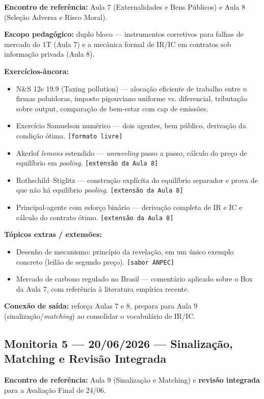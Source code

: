 \documentclass[11pt,a4paper]{article}
\newcommand{\ns}{N\&S 12e}
\begin{document}
\textbf{Encontro de referência:} Aula 7 (Externalidades e Bens Públicos) e Aula 8 (Seleção Adversa e Risco Moral).

\textbf{Escopo pedagógico:} duplo bloco --- instrumentos corretivos para falhas de mercado do 1T (Aula 7) e a mecânica formal de IR/IC em contratos sob informação privada (Aula 8).

\textbf{Exercícios-âncora:}
\begin{itemize}
  \item \ns{} 19.9 (Taxing pollution) --- alocação eficiente de trabalho entre $n$ firmas poluidoras, imposto pigouviano uniforme vs. diferencial, tributação sobre output, comparação de bem-estar com cap de emissões.
  \item Exercício Samuelson numérico --- dois agentes, bem público, derivação da condição ótima. \texttt{[formato livre]}
  \item Akerlof \textit{lemons} estendido --- \textit{unraveling} passo a passo, cálculo do preço de equilíbrio em \textit{pooling}. \texttt{[extensão da Aula 8]}
  \item Rothschild--Stiglitz --- construção explícita do equilíbrio separador e prova de que não há equilíbrio \textit{pooling}. \texttt{[extensão da Aula 8]}
  \item Principal-agente com esforço binário --- derivação completa de IR e IC e cálculo do contrato ótimo. \texttt{[extensão da Aula 8]}
\end{itemize}

\textbf{Tópicos extras / extensões:}
\begin{itemize}
  \item Desenho de mecanismo: princípio da revelação, em um único exemplo concreto (leilão de segundo preço). \texttt{[sabor ANPEC]}
  \item Mercado de carbono regulado no Brasil --- comentário aplicado sobre o Box da Aula 7, com referência à literatura empírica recente.
\end{itemize}

\textbf{Conexão de saída:} reforça Aulas 7 e 8, prepara para Aula 9 (sinalização/\textit{matching}) ao consolidar o vocabulário de IR/IC.

\subsection{Monitoria 5 --- 20/06/2026 --- Sinalização, Matching e Revisão Integrada}

\textbf{Encontro de referência:} Aula 9 (Sinalização e Matching) e \textbf{revisão integrada} para a Avaliação Final de 24/06.
\end{document}
